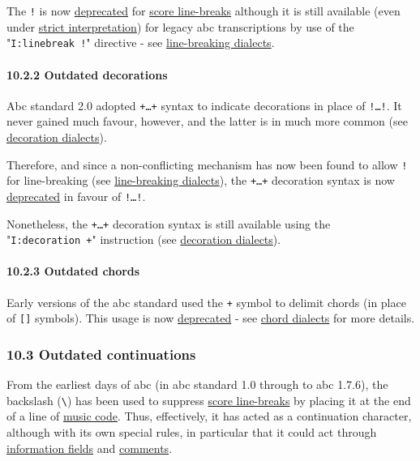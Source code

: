 The \texttt{!} is now \protect\hyperlink{outdated_syntax}{deprecated}
for \protect\hyperlink{score_line-break_definition}{score line-breaks}
although it is still available (even under
\protect\hyperlink{strict_interpretation}{strict interpretation}) for
legacy abc transcriptions by use of the "\texttt{I:linebreak\ !}"
directive - see \protect\hyperlink{line-breaking_dialects}{line-breaking
dialects}.

\hypertarget{outdated_decorations}{\paragraph{10.2.2 Outdated
decorations}\label{outdated_decorations}}

Abc standard 2.0 adopted \texttt{+\ldots{}+} syntax to indicate
decorations in place of \texttt{!\ldots{}!}. It never gained much
favour, however, and the latter is in much more common (see
\protect\hyperlink{decoration_dialects}{decoration dialects}).

Therefore, and since a non-conflicting mechanism has now been found to
allow \texttt{!} for line-breaking (see
\protect\hyperlink{line-breaking_dialects}{line-breaking dialects}), the
\texttt{+\ldots{}+} decoration syntax is now
\protect\hyperlink{outdated_syntax}{deprecated} in favour of
\texttt{!\ldots{}!}.

Nonetheless, the \texttt{+\ldots{}+} decoration syntax is still
available using the "\texttt{I:decoration\ +}" instruction (see
\protect\hyperlink{decoration_dialects}{decoration dialects}).

\hypertarget{outdated_chords}{\paragraph{10.2.3 Outdated
chords}\label{outdated_chords}}

Early versions of the abc standard used the \texttt{+} symbol to delimit
chords (in place of \texttt{{[}{]}} symbols). This usage is now
\protect\hyperlink{outdated_syntax}{deprecated} - see
\protect\hyperlink{chord_dialects}{chord dialects} for more details.

\hypertarget{outdated_continuations}{\subsubsection{10.3 Outdated
continuations}\label{outdated_continuations}}

From the earliest days of abc (in abc standard 1.0 through to abc
1.7.6), the backslash (\texttt{\textbackslash{}}) has been used to
suppress \protect\hyperlink{score_line-break_definition}{score
line-breaks} by placing it at the end of a line of
\protect\hyperlink{music_code_definition}{music code}. Thus,
effectively, it has acted as a continuation character, although with its
own special rules, in particular that it could act through
\protect\hyperlink{information_field_definition}{information fields} and
\protect\hyperlink{comment_definition}{comments}.

